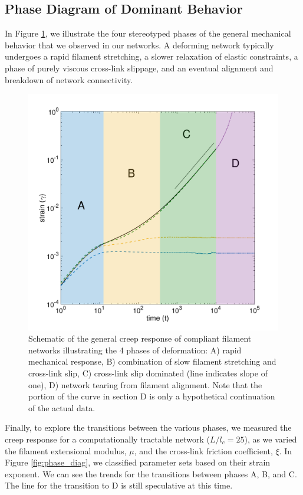 \subsection{Phase Diagram of Dominant Behavior}
In Figure \ref{fig:shear_modes}, we illustrate the four stereotyped phases of the general mechanical behavior that we observed in our networks.  A deforming network typically undergoes a rapid filament stretching, a slower relaxation of elastic constraints, a phase of purely viscous cross-link slippage, and an eventual alignment and breakdown of network connectivity.

\begin{figure}[h!]
\centering
\includegraphics[width=\hsize]{slippage/shear_modes_b}
\caption{ \label{fig:shear_modes} Schematic of the general creep response of compliant filament networks illustrating the 4 phases of deformation: A) rapid mechanical response, B) combination of slow filament stretching and cross-link slip, C) cross-link slip dominated (line indicates slope of one), D) network tearing from filament alignment. Note that the portion of the curve in section D is only a hypothetical continuation of the actual data.  }
\end{figure}


Finally, to explore the transitions between the various phases, we measured the creep response for a computationally tractable network ($L/l_c = 25$), as we varied the filament extensional modulus, $\mu$, and the cross-link friction coefficient, $\xi$.  In Figure \ref{fig:phase_diag}, we classified parameter sets based on their strain exponent.  We can see the trends for the transitions between phases A, B, and C.  The line for the transition to D is still speculative at this time.  

